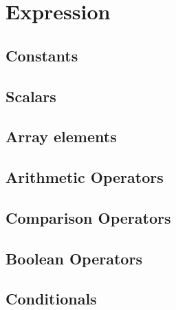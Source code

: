\section{Expression}
\subsection{Constants}
\subsection{Scalars}
\subsection{Array elements}
\subsection{Arithmetic Operators}
\subsection{Comparison Operators}
\subsection{Boolean Operators}
\subsection{Conditionals}
